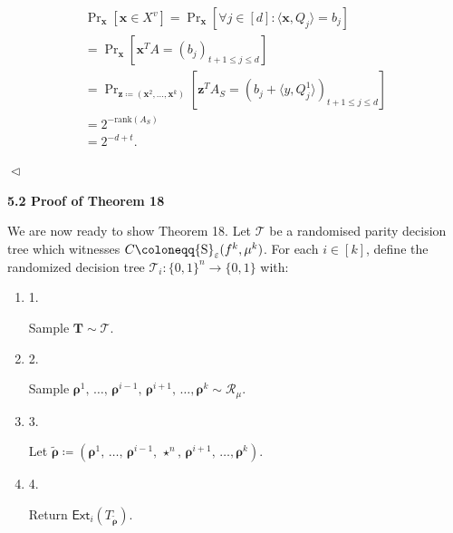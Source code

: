 \documentclass[10pt,a4paper]{article}
\begin{document}
\[\begin{gathered}
\displaystyle\Pr\nolimits_{\bm{x}}[\bm{x}\in X^{v}] \displaystyle=\Pr\nolimits_{\bm{x}}[\forall j\in[d]:\langle\bm{x},Q_{j}\rangle=b_{j}] \\
\displaystyle=\Pr\nolimits_{\bm{x}}[\bm{x}^{T}A=(b_{j})_{t+1\leq j\leq d}] \\
\displaystyle=\Pr\nolimits_{\bm{z}\coloneqq(\bm{x}^{2},\dots,\bm{x}^{k})}\left[\bm{z}^{T}A_{S}=(b_{j}+\langle y,Q_{j}^{1}\rangle)_{t+1\leq j\leq d}\right] \\
\displaystyle=2^{-\mathrm{rank}(A_{S})} \\
\displaystyle=2^{-d+t}.\
\end{gathered}\]


$\vartriangleleft$\par






\par\medskip\noindent\textbf{
5.2 Proof of Theorem 18
}\par




We are now ready to show Theorem 18. Let $\mathcal{T}$ be a randomised parity decision tree which witnesses $C\coloneqq{\textup{S}}_{\varepsilon}(f^{k},\mu^{k})$. For each $i\in[k]$, define the randomized decision tree $\mathcal{T}_{i}\colon\{0,1\}^{n}\to\{0,1\}$ with:\par


\begin{enumerate}


\item[] 
1. 


Sample $\bm{T}\sim\mathcal{T}$.\par





\item[] 
2. 


Sample $\bm{\rho}^{1},\,\ldots,\,\bm{\rho}^{i-1},\,\bm{\rho}^{i+1},\,\ldots,\bm{\rho}^{k}\sim\mathcal{R}_{\mu}$.\par





\item[] 
3. 


Let $\widetilde{\bm{\rho}}\coloneqq(\bm{\rho}^{1},\,\ldots,\,\bm{\rho}^{i-1},\,\star^{n},\,\bm{\rho}^{i+1},\,\ldots,\bm{\rho}^{k})$.\par





\item[] 
4. 


Return $\mathsf{Ext}_{i}\mathopen{}\left(T_{\widetilde{\bm{\rho}}}\mathclose{}\right)$.\par





\end{enumerate}
\end{document}
